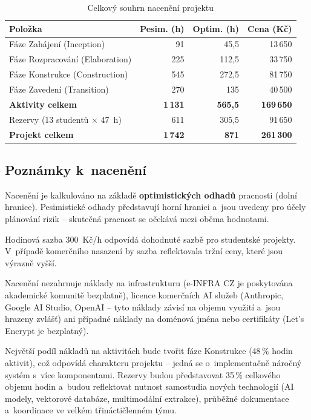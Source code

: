 \documentclass[a4paper, 11pt]{article}
\begin{document}
\begin{table}[H]
\centering
\begin{tabularx}{\textwidth}{X r r r}
\toprule
\textbf{Položka} & \textbf{Pesim. (h)} & \textbf{Optim. (h)} & \textbf{Cena (Kč)} \\
\midrule
Fáze Zahájení (Inception) & 91 & 45,5 & 13\,650 \\
Fáze Rozpracování (Elaboration) & 225 & 112,5 & 33\,750 \\
Fáze Konstrukce (Construction) & 545 & 272,5 & 81\,750 \\
Fáze Zavedení (Transition) & 270 & 135 & 40\,500 \\
\midrule
\textbf{Aktivity celkem} & \textbf{1\,131} & \textbf{565,5} & \textbf{169\,650} \\
\addlinespace
Rezervy (13 studentů $\times$ 47~h) & 611 & 305,5 & 91\,650 \\
\midrule
\textbf{Projekt celkem} & \textbf{1\,742} & \textbf{871} & \textbf{261\,300} \\
\bottomrule
\end{tabularx}
\caption{Celkový souhrn nacenění projektu}
\label{tab:cena-souhrn}
\end{table}

\subsection{Poznámky k~nacenění}

Nacenění je kalkulováno na základě \textbf{optimistických odhadů} pracnosti (dolní hranice). Pesimistické odhady představují horní hranici a~jsou uvedeny pro účely plánování rizik -- skutečná pracnost se očekává mezi oběma hodnotami.

Hodinová sazba 300~Kč/h odpovídá dohodnuté sazbě pro studentské projekty. V~případě komerčního nasazení by sazba reflektovala tržní ceny, které jsou výrazně vyšší.

Nacenění nezahrnuje náklady na infrastrukturu (e-INFRA CZ je poskytována akademické komunitě bezplatně), licence komerčních AI služeb (Anthropic, Google AI Studio, OpenAI -- tyto náklady závisí na objemu využití a~jsou hrazeny zvlášť) ani případné náklady na doménová jména nebo certifikáty (Let's Encrypt je bezplatný).

Největší podíl nákladů na aktivitách bude tvořit fáze Konstrukce (48\,\% hodin aktivit), což odpovídá charakteru projektu -- jedná se o~implementačně náročný systém s~více komponentami. Rezervy budou představovat 35\,\% celkového objemu hodin a~budou reflektovat nutnost samostudia nových technologií (AI modely, vektorové databáze, multimodální extrakce), průběžné dokumentace a~koordinace ve velkém třináctičlenném týmu.
\end{document}
